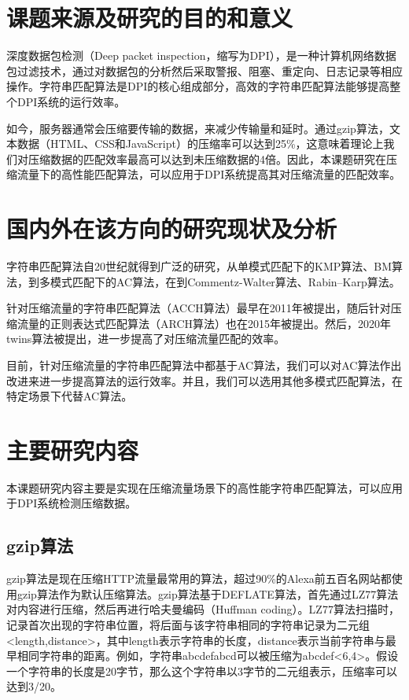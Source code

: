 
\section{课题来源及研究的目的和意义}
深度数据包检测（Deep packet inspection，缩写为DPI），是一种计算机网络数据包过滤技术，通过对数据包的分析然后采取警报、阻塞、重定向、日志记录等相应操作。字符串匹配算法是DPI的核心组成部分，高效的字符串匹配算法能够提高整个DPI系统的运行效率。

如今，服务器通常会压缩要传输的数据，来减少传输量和延时。通过gzip算法\cite{RFC1952}，文本数据（HTML、CSS和JavaScript）的压缩率可以达到25\%，这意味着理论上我们对压缩数据的匹配效率最高可以达到未压缩数据的4倍。因此，本课题研究在压缩流量下的高性能匹配算法，可以应用于DPI系统提高其对压缩流量的匹配效率。


\section{国内外在该方向的研究现状及分析}
字符串匹配算法自20世纪就得到广泛的研究，从单模式匹配下的KMP算法\cite{knuth1977fast}、BM算法\cite{boyer1977fast}，到多模式匹配下的AC算法\cite{aho1975efficient}，在到Commentz-Walter算法\cite{commentz1979string}、Rabin–Karp算法\cite{karp1987efficient}。

针对压缩流量的字符串匹配算法（ACCH算法）最早在2011年被提出\cite{bremler2011accelerating}，随后针对压缩流量的正则表达式匹配算法（ARCH算法）\cite{becchi2015accelerating}也在2015年被提出。然后，2020年twins算法\cite{sun2020efficient}被提出，进一步提高了对压缩流量匹配的效率。

目前，针对压缩流量的字符串匹配算法中都基于AC算法，我们可以对AC算法作出改进来进一步提高算法的运行效率\cite{李雪莹2004字符串匹配技术研究}。并且，我们可以选用其他多模式匹配算法，在特定场景下代替AC算法。

\section{主要研究内容}
本课题研究内容主要是实现在压缩流量场景下的高性能字符串匹配算法，可以应用于DPI系统检测压缩数据。

\subsection{gzip算法}
gzip算法\cite{RFC1952}是现在压缩HTTP流量最常用的算法，超过90\%的Alexa前五百名网站都使用gzip算法作为默认压缩算法。gzip算法基于DEFLATE算法，首先通过LZ77算法对内容进行压缩，然后再进行哈夫曼编码（Huffman coding）。LZ77算法扫描时，记录首次出现的字符串位置，将后面与该字符串相同的字符串记录为二元组<length,distance>，其中length表示字符串的长度，distance表示当前字符串与最早相同字符串的距离。例如，字符串abcdefabcd可以被压缩为abcdef<6,4>。假设一个字符串的长度是20字节，那么这个字符串以3字节的二元组表示，压缩率可以达到3/20。



